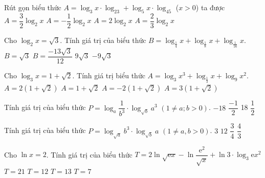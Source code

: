 \begin{ex}%
	Rút gọn biểu thức $A=\log_3x\cdot\log_23+\log_5x\cdot\log_45$ ($x>0$) ta được 
	\choice
	{\True $A=\dfrac{3}{2}\log_2x$}
	{$A=-\dfrac{1}{2}\log_2x$}
	{$A=2\log_2x$}
	{$A=\dfrac{2}{3}\log_2x$}
\end{ex}

\begin{ex}%
	Cho $\log_2x=\sqrt{3}$. Tính giá trị của biểu thức $B=\log_{\tfrac{1}{4}}x+\log_{\tfrac{1}{8}}x+\log_{\tfrac{1}{16}}x$.
	\choice
	{$B=\sqrt{3}$}
	{\True $B=\dfrac{-13\sqrt{3}}{12}$}
	{$9\sqrt{3}$}
	{$-9\sqrt{3}$}
\end{ex}

\begin{ex}%
	Cho $\log_3x=1+\sqrt{2}$. Tính giá trị biểu thức $A=\log_3x^3+\log_{\tfrac{1}{3}}x+\log_9x^2$.
	\choice
	{$A=2(1+\sqrt{2})$}
	{$A=1+\sqrt{2}$}
	{$A=-2(1+\sqrt{2})$}
	{\True $A=3(1+\sqrt{2})$}
\end{ex}

\begin{ex}%
	Tính giá trị của biểu thức $P=\log_a\dfrac{1}{b^3}\cdot\log_{\sqrt{b}}a^3$ $\left(1\neq a;b>0\right)$.
	\choice
	{\True $-18$}
	{$\dfrac{-1}{2}$}
	{18}
	{$\dfrac{1}{2}$}
\end{ex}

\begin{ex}%
	Tính giá trị của biểu thức $P=\log_{\sqrt{a}}b^3\cdot\log_{\sqrt{b}}a$ $\left(1\neq a,b>0\right)$.
	\choice
	{$3$}
	{\True $12$}
	{$\dfrac{3}{4}$}
	{$\dfrac{4}{3}$}
\end{ex}

\begin{ex}%
	Cho $\ln x=2$. Tính giá trị của biểu thức $T=2\ln\sqrt{\mathrm{e}x}-\ln\dfrac{\mathrm{e}^2}{\sqrt{x}}+\ln 3\cdot\log_3\mathrm{e}x^2$ 
	\choice
	{$T=21$}
	{$T=12$}
	{$T=13$}
	{\True $T=7$}
\end{ex}


